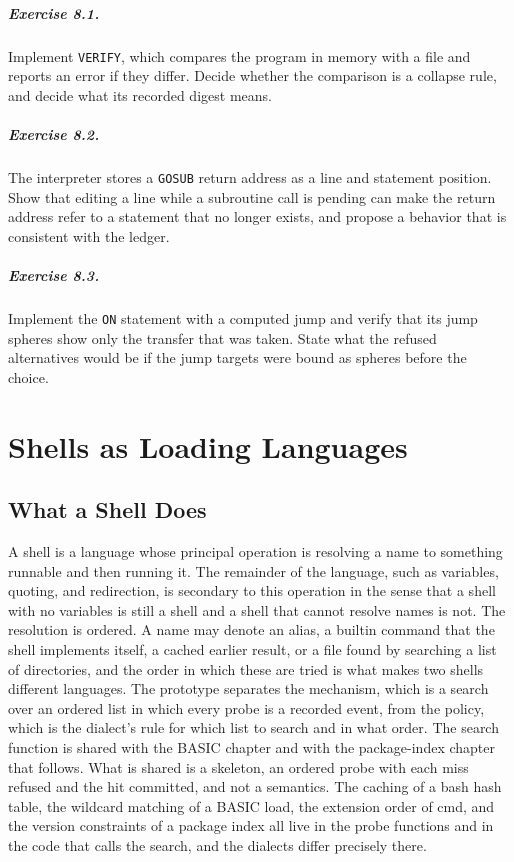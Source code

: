 \paragraph{Exercise 8.1.} Implement \texttt{VERIFY}, which compares the program in memory with a file and reports an error if they differ. Decide whether the comparison is a collapse rule, and decide what its recorded digest means.

\paragraph{Exercise 8.2.} The interpreter stores a \texttt{GOSUB} return address as a line and statement position. Show that editing a line while a subroutine call is pending can make the return address refer to a statement that no longer exists, and propose a behavior that is consistent with the ledger.

\paragraph{Exercise 8.3.} Implement the \texttt{ON} statement with a computed jump and verify that its jump spheres show only the transfer that was taken. State what the refused alternatives would be if the jump targets were bound as spheres before the choice.

\chapter{Shells as Loading Languages}

\section{What a Shell Does}

A shell is a language whose principal operation is resolving a name to something runnable and then running it. The remainder of the language, such as variables, quoting, and redirection, is secondary to this operation in the sense that a shell with no variables is still a shell and a shell that cannot resolve names is not. The resolution is ordered. A name may denote an alias, a builtin command that the shell implements itself, a cached earlier result, or a file found by searching a list of directories, and the order in which these are tried is what makes two shells different languages. The prototype separates the mechanism, which is a search over an ordered list in which every probe is a recorded event, from the policy, which is the dialect's rule for which list to search and in what order. The search function is shared with the BASIC chapter and with the package-index chapter that follows. What is shared is a skeleton, an ordered probe with each miss refused and the hit committed, and not a semantics. The caching of a bash hash table, the wildcard matching of a BASIC load, the extension order of cmd, and the version constraints of a package index all live in the probe functions and in the code that calls the search, and the dialects differ precisely there.

